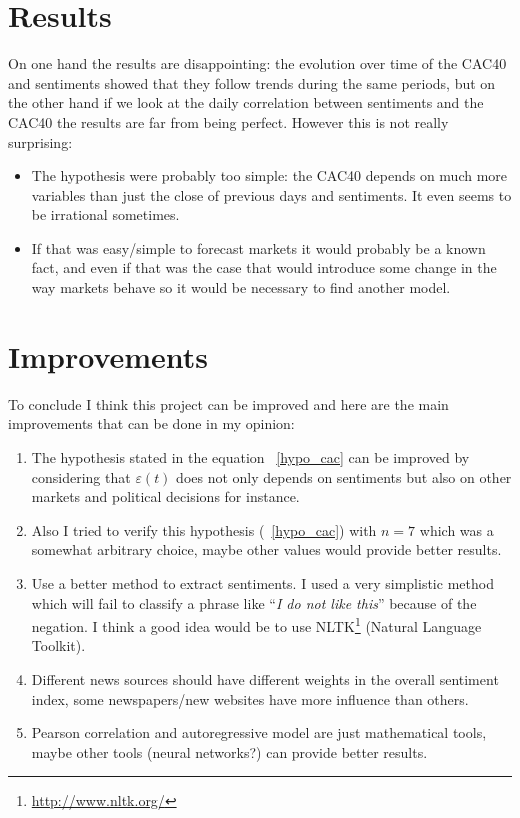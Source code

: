 \documentclass[12pt]{report}
\begin{document}
\section{Results}
On one hand the results are disappointing: the evolution over time of the CAC40 and sentiments showed that they follow trends during the same periods, but on the other hand if we look at the daily correlation between sentiments and the CAC40 the results are far from being perfect. However this is not really surprising:
\begin{itemize}
	\item The hypothesis were probably too simple: the CAC40 depends on much more variables than just the close of previous days and sentiments. It even seems to be irrational sometimes.
	\item If that was easy/simple to forecast markets it would probably be a known fact, and even if that was the case that would introduce some change in the way markets behave so it would be necessary to find another model.
\end{itemize}

\section{Improvements}
To conclude I think this project can be improved and here are the main improvements that can be done in my opinion:
\begin{enumerate}
	\item The hypothesis stated in the equation ~\ref{hypo_cac} can be improved by considering that $\varepsilon(t)$ does not only depends on sentiments but also on other markets and political decisions for instance.
	\item Also I tried to verify this hypothesis (~\ref{hypo_cac}) with $n = 7$ which was a somewhat arbitrary choice, maybe other values would provide better results.
	\item Use a better method to extract sentiments. I used a very simplistic method which will fail to classify a phrase like ``\emph{I do not like this}'' because of the negation. I think a good idea would be to use NLTK\footnote{\url{http://www.nltk.org/}} (Natural Language Toolkit).
	\item Different news sources should have different weights in the overall sentiment index, some newspapers/new websites have more influence than others.
	\item Pearson correlation and autoregressive model are just mathematical tools, maybe other tools (neural networks?) can provide better results.
\end{enumerate}



\end{document}
